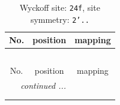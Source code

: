 \documentclass[fleqn,8pt]{jsarticle}
\begin{document}
\renewcommand{\arraystretch}{1.2}
\begin{longtable}{ccc}
\caption{Wyckoff site: {\tt 24f}, site symmetry: {\tt 2'..}}
 \\
 \hline \hline
No. & position & mapping \\ \hline \endfirsthead

\multicolumn{2}{l}{\tablename\ \thetable{}} \\
 \hline \hline
No. & position & mapping \\ \hline \endhead

 \hline \hline
\multicolumn{2}{r}{\footnotesize\it continued ...} \\ \endfoot

 \hline \hline
\multicolumn{2}{r}{} \\ \endlastfoot


\end{longtable}
\end{document}
